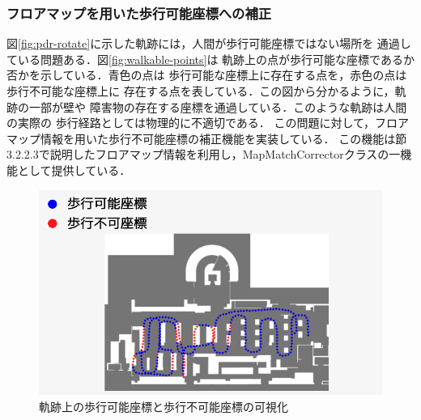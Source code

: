 
\subsubsection{フロアマップを用いた歩行可能座標への補正}

図\ref{fig:pdr-rotate}に示した軌跡には，人間が歩行可能座標ではない場所を
通過している問題ある．図\ref{fig:walkable-points}は
軌跡上の点が歩行可能な座標であるか否かを示している．青色の点は
歩行可能な座標上に存在する点を，赤色の点は歩行不可能な座標上に
存在する点を表している．この図から分かるように，軌跡の一部が壁や
障害物の存在する座標を通過している．このような軌跡は人間の実際の
歩行経路としては物理的に不適切である．
この問題に対して，フロアマップ情報を用いた歩行不可能座標の補正機能を実装している．
この機能は節3.2.2.3で説明したフロアマップ情報を利用し，MapMatchCorrectorクラスの一機能として提供している．




\begin{figure}[H]
    \centering
    \includegraphics[width=\linewidth]{../image/unwalkable_points.jpg}
    \caption{
      軌跡上の歩行可能座標と歩行不可能座標の可視化
    }    \label{fig:unwalkable_points}
\end{figure}


